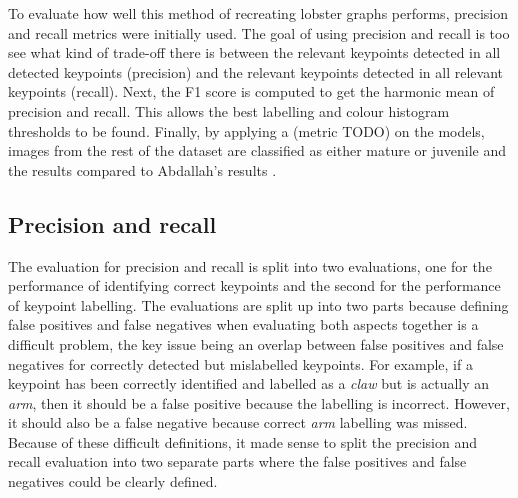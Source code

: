\newcommand{\fourplot}[3]{
\begin{minipage}{0.45\textwidth}
	#1{#2}{0.3}{#3}
\end{minipage}
%
\begin{minipage}{0.45\textwidth}
	#1{#2}{0.5}{#3}
\end{minipage}
\\
\begin{minipage}{0.45\textwidth}
	#1{#2}{0.7}{#3}
\end{minipage}
%
\begin{minipage}{0.45\textwidth}
	#1{#2}{0.9}{#3}
\end{minipage}
}

\newcommand{\fourplotlabel}[4]{
\begin{minipage}{0.45\textwidth}
	#1{#2}{0.3}{#3}{#4}
\end{minipage}
%
\begin{minipage}{0.45\textwidth}
	#1{#2}{0.5}{#3}{#4}
\end{minipage}
\\
\begin{minipage}{0.45\textwidth}
	#1{#2}{0.7}{#3}{#4}
\end{minipage}
%
\begin{minipage}{0.45\textwidth}
	#1{#2}{0.9}{#3}{#4}
\end{minipage}
}


To evaluate how well this method of recreating lobster graphs performs, precision and recall metrics were initially used. The goal of using precision and recall is too see what kind of trade-off there is between the relevant keypoints detected in all detected keypoints (precision) and the relevant keypoints detected in all relevant keypoints (recall). Next, the F1 score is computed to get the harmonic mean of precision and recall. This allows the best labelling and colour histogram thresholds to be found. Finally, by applying a (metric TODO) on the models, images from the rest of the dataset are classified as either mature or juvenile and the results compared to Abdallah's results \cite{lobster-thesis}.
\n

\subsection{Precision and recall}
The evaluation for precision and recall is split into two evaluations, one for the performance of identifying correct keypoints and the second for the performance of keypoint labelling. The evaluations are split up into two parts because defining false positives and false negatives when evaluating both aspects together is a difficult problem, the key issue being an overlap between false positives and false negatives for correctly detected but mislabelled keypoints. For example, if a keypoint has been correctly identified and labelled as a \textit{claw} but is actually an \textit{arm}, then it should be a false positive because the labelling is incorrect. However, it should also be a false negative because correct \textit{arm} labelling was missed. Because of these difficult definitions, it made sense to split the precision and recall evaluation into two separate parts where the false positives and false negatives could be clearly defined. 

